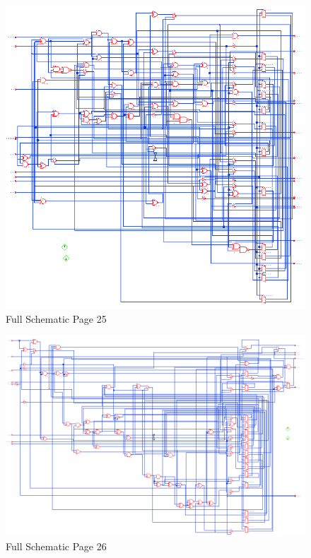 \documentclass[11pt]{article}
\begin{document}
		
		\begin{figure}[H] 
			\centering 
			\includegraphics[width=\textwidth,height=\dimexpr\textheight-4\baselineskip-\abovecaptionskip-\belowcaptionskip\relax,keepaspectratio]{"Pictures/Full Schematic Page 25"}
			\caption{Full Schematic Page 25} 
			\label{fig:Full-Schematic-Page-25} 
		\end{figure}
		
		
		\begin{figure}[H] 
			\centering 
			\includegraphics[width=\textwidth,height=\dimexpr\textheight-4\baselineskip-\abovecaptionskip-\belowcaptionskip\relax,keepaspectratio]{"Pictures/Full Schematic Page 26"}
			\caption{Full Schematic Page 26} 
			\label{fig:Full-Schematic-Page-26} 
		\end{figure}
		
\end{document}

